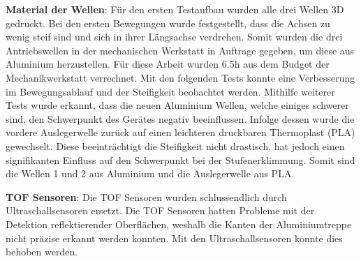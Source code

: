 \textbf{Material der Wellen}:
Für den ersten Testaufbau wurden alle drei Wellen 3D gedruckt. Bei den ersten Bewegungen wurde festgestellt, dass die Achsen zu wenig steif sind und sich in ihrer Längsachse verdrehen. Somit wurden die drei Antriebswellen in der mechanischen Werkstatt in Auftrage gegeben, um diese aus Aluminium herzustellen. Für diese Arbeit wurden 6.5h aus dem Budget der Mechanikwerkstatt verrechnet. Mit den folgenden Tests konnte eine Verbesserung im Bewegungsablauf und der Steifigkeit beobachtet werden. Mithilfe weiterer Tests wurde erkannt, dass die neuen Aluminium Wellen, welche einiges schwerer sind, den Schwerpunkt des Gerätes negativ beeinflussen. Infolge dessen wurde die vordere Auslegerwelle zurück auf einen leichteren druckbaren Thermoplast (PLA) gewechselt. Diese beeinträchtigt die Steifigkeit nicht drastisch, hat jedoch einen signifikanten Einfluss auf den Schwerpunkt bei der Stufenerklimmung. Somit sind die Wellen 1 und 2 aus Aluminium und die Auslegerwelle aus PLA.

\textbf{TOF Sensoren}:
Die TOF Sensoren wurden schlussendlich durch Ultraschallsensoren ersetzt. Die TOF Sensoren hatten Probleme mit der Detektion reflektierender Oberflächen, weshalb die Kanten der Aluminiumtreppe nicht präzise erkannt werden konnten. Mit den Ultraschallsensoren konnte dies behoben werden.